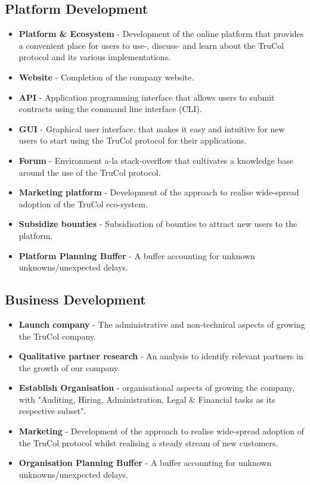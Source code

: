 \subsection{Platform Development}
\begin{itemize}
	\item \textbf{Platform \& Ecosystem} - Development of the online platform that provides a convenient place for users to use-, discuss- and learn about the TruCol protocol and its various implementations.
	\item \textbf{Website} - Completion of the company website.
	\item \textbf{API} - Application programming interface that allows users to submit contracts using the command line interface (CLI).
	\item \textbf{GUI} - Graphical user interface, that makes it easy and intuitive for new users to start using the TruCol protocol for their applications.
	\item \textbf{Forum} - Environment a-la stack-overflow that cultivates a knowledge base around the use of the TruCol protocol.
	\item \textbf{Marketing platform} - Development of the approach to realise wide-spread adoption of the TruCol eco-system.
	\item \textbf{Subsidize bounties} - Subsidisation of bounties to attract new users to the platform.
	\item \textbf{Platform Planning Buffer} -  A buffer accounting for unknown unknowns/unexpected delays.
\end{itemize}

\subsection{Business Development}
\begin{itemize}
	\item \textbf{Launch company} -  The administrative and non-technical aspects of growing the TruCol company.
	\item \textbf{Qualitative partner research} - An analysis to identify relevant partners in the growth of our company.
	\item \textbf{Establish Organisation} - organisational aspects of growing the company, with "Auditing, Hiring, Administration, Legal \& Financial tasks as its respective subset".
	\item \textbf{Marketing} - Development of the approach to realise wide-spread adoption of the TruCol protocol whilst realising a steady stream of new customers.
	\item \textbf{Organisation Planning Buffer} -  A buffer accounting for unknown unknowns/unexpected delays.
\end{itemize}

